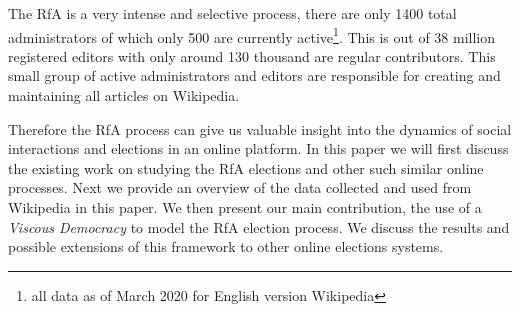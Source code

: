The RfA is a very intense and selective process, there are only 1400 total administrators of which only 500 are currently active\footnote{all data as of March 2020 for English version Wikipedia}. This is out of 38 million registered editors with only around 130 thousand are regular contributors. This small group of active administrators and editors are responsible for creating and maintaining all articles on Wikipedia.
\smallskip

Therefore the RfA process can give us valuable insight into the dynamics of social interactions and elections in an online platform. In this paper we will first discuss the existing work on studying the RfA elections and other such similar online processes. Next we provide an overview of the data collected and used from Wikipedia in this paper. We then present our main contribution, the use of a \textit{Viscous Democracy} to model the RfA election process. We discuss the results and possible extensions of this framework to other online elections systems.  


